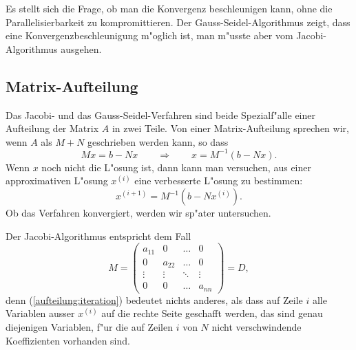 Es stellt sich die Frage, ob man die Konvergenz beschleunigen kann,
ohne die Parallelisierbarkeit zu kompromittieren.
Der Gauss-Seidel-Algorithmus zeigt, dass eine Konvergenzbeschleunigung
m"oglich ist, man m"usste aber vom Jacobi-Algorithmus ausgehen.


\subsection{Matrix-Aufteilung\label{section-matrix-aufteilung}}
Das Jacobi- und das Gauss-Seidel-Verfahren sind beide Spezialf"alle
einer Aufteilung der Matrix $A$ in zwei Teile. 
Von einer Matrix-Aufteilung sprechen wir, wenn $A$ als $M+N$ geschrieben
werden kann, so dass
\begin{equation}
Mx=b-Nx
\qquad
\Rightarrow
\qquad
x=M^{-1}(b-Nx).
\label{aufteilung:iteration}
\end{equation}
Wenn $x$ noch nicht die L"osung ist, dann kann man versuchen, aus einer
approximativen L"osung $x^{(i)}$ eine verbesserte L"osung zu bestimmen:
\[
x^{(i+1)}=M^{-1}(b - Nx^{(i)}).
\]
Ob das Verfahren konvergiert, werden wir sp"ater untersuchen.

Der Jacobi-Algorithmus entspricht dem Fall 
\begin{equation}
M=\begin{pmatrix}
a_{11}&     0&\dots &0\\
     0&a_{22}&\dots &0\\
\vdots&\vdots&\ddots&\vdots\\
     0&     0&\dots &a_{nn}
\end{pmatrix}=D,
\label{jacobi-aufteilung}
\end{equation}
denn (\ref{aufteilung:iteration}) bedeutet nichts anderes,
als dass auf Zeile $i$ alle Variablen ausser $x^{(i)}$ auf die rechte
Seite geschafft werden, das sind genau diejenigen Variablen, f"ur die
auf Zeilen $i$ von $N$ nicht verschwindende Koeffizienten vorhanden sind.

